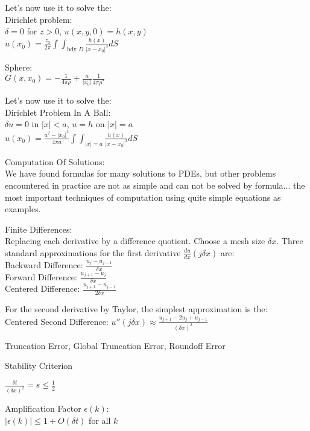 Let's now use it to solve the: \\
Dirichlet problem: \\
$\delta = 0$ for $z>0$, $u(x,y,0)=h(x,y)$ \\
$u(x_0)=\frac{z_0}{2 \pi} \int \int_{\text{bdy }D} \frac{h(x)}{|x-x_0|^3} dS$

Sphere: \\
$G(x,x_0)=-\frac{1}{4 \pi \rho}+\frac{a}{|x_0|} \frac{1}{4 \pi \rho^*}$

Let's now use it to solve the: \\
Dirichlet Problem In A Ball: \\
$\delta u=0$ in $|x|<a$, $u=h$ on $|x|=a$ \\
$u(x_0)=\frac{a^2-|x_0|^2}{4 \pi a} \int \int_{|x|=a} \frac{h(x)}{|x-x_0|^3} dS$

Computation Of Solutions: \\
We have found formulas for many solutions to PDEs, but other problems encountered in practice are not as simple and can not be solved by formula... the most important techniques of computation using quite simple equations as examples.

Finite Differences: \\
Replacing each derivative by a difference quotient. Choose a mesh size $\delta x$. Three standard approximations for the first derivative $\frac{du}{dx} (j \delta x)$ are: \\
Backward Difference: $\frac{u_j - u_{j-1}}{\delta x}$ \\
Forward Difference: $\frac{u_{j+1}-u_{j}}{\delta x}$ \\
Centered Difference: $\frac{u_{j+1}-u_{j-1}}{2 \delta x}$

For the second derivative by Taylor, the simplest approximation is the: \\
Centered Second Difference: $u''(j \delta x) \approx \frac{u_{j+1}-2u_j+u_{j-1}}{(\delta x)^2}$

Truncation Error, Global Truncation Error, Roundoff Error

Stability Criterion

$\frac{\delta t}{(\delta x)^2} = s \le \frac{1}{2}$

Amplification Factor $\epsilon (k)$: \\
$|\epsilon (k)|\le 1 + O(\delta t)$ for all $k$

